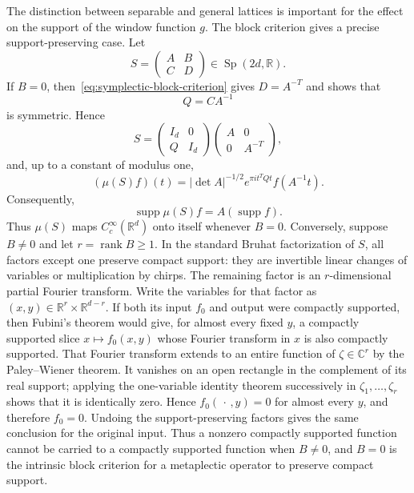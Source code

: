 \documentclass[11pt,reqno]{amsart}
\numberwithin{equation}{section}
\theoremstyle{definition}
\theoremstyle{remark}
\newcommand{\R}{\mathbb R}
\newcommand{\C}{\mathbb C}
\newcommand{\supp}{\operatorname{supp}}
\newcommand{\rank}{\operatorname{rank}}
\newcommand{\Sp}{\operatorname{Sp}}
\begin{document}
The distinction between separable and general lattices is important for the
effect on the support of the window function $g$.  The block criterion gives
a precise support-preserving case.  Let
\[
 S=\begin{pmatrix}A&B\\ C&D\end{pmatrix}\in\Sp(2d,\R).
\]
If $B=0$, then~\eqref{eq:symplectic-block-criterion} gives
$D=A^{-T}$ and shows that
\[
 Q=CA^{-1}
\]
is symmetric.  Hence
\[
 S=
 \begin{pmatrix}I_d&0\\ Q&I_d\end{pmatrix}
 \begin{pmatrix}A&0\\0&A^{-T}\end{pmatrix},
\]
and, up to a constant of modulus one,
\begin{equation}\label{eq:metaplectic-lower-triangular-formula}
 (\mu(S)f)(t)
 =|\det A|^{-1/2}e^{\pi i t^TQt}f(A^{-1}t).
\end{equation}
Consequently,
\begin{equation}\label{eq:metaplectic-support-image}
 \supp\mu(S)f=A(\supp f).
\end{equation}
Thus $\mu(S)$ maps $C_c^\infty(\R^d)$ onto itself whenever $B=0$.
Conversely, suppose $B\ne0$ and let $r=\rank B\ge1$.  In the standard
Bruhat factorization of $S$, all factors except one preserve compact support:
they are invertible linear changes of variables or multiplication by chirps.
The remaining factor is an $r$-dimensional partial Fourier transform.  Write
the variables for that factor as $(x,y)\in\R^r\times\R^{d-r}$.  If both its
input $f_0$ and output were compactly supported, then Fubini's theorem would
give, for almost every fixed $y$, a compactly supported slice
$x\mapsto f_0(x,y)$ whose Fourier transform in $x$ is also compactly
supported.  That Fourier transform extends to an entire function of
$\zeta\in\C^r$ by the Paley--Wiener theorem.  It vanishes on an open
rectangle in the complement of its real support; applying the one-variable
identity theorem successively in $\zeta_1,\ldots,\zeta_r$ shows that it is
identically zero.  Hence $f_0(\,\cdot\,,y)=0$ for almost every $y$, and
therefore $f_0=0$.  Undoing the support-preserving factors gives the same
conclusion for the original input.  Thus a nonzero compactly supported
function cannot be carried to a compactly supported function when $B\ne0$,
and $B=0$ is the intrinsic block criterion for a metaplectic operator to
preserve compact support.
\end{document}
